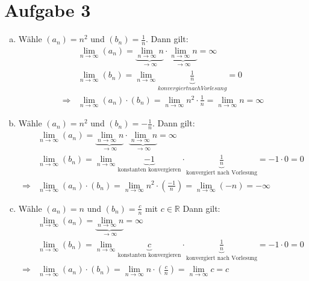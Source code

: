 \documentclass{scrreprt}
\newcommand{\RR}{\mathbb{R}}
\begin{document}
	\section*{Aufgabe 3}
	\begin{enumerate}[(a)]
		\item
			Wähle $(a_n) = n^2$ und $(b_n) = \frac{1}{n}$. Dann gilt:
			\begin{align*}
				&\lim\limits_{n \to \infty} (a_n) = \underbrace{\lim\limits_{n \to \infty} n}_{\rightarrow\infty} \cdot \underbrace{\lim\limits_{n \to \infty} n}_{\rightarrow\infty} = \infty\\
				&\lim\limits_{n \to \infty} (b_n) = \lim\limits_{n \to \infty} \underbrace{\frac{1}{n}}_{konvergiert nach Vorlesung} = 0\\
				\Rightarrow& \lim\limits_{n \to \infty} (a_n) \cdot (b_n) = \lim\limits_{n \to \infty} n^2 \cdot \frac{1}{n} = \lim\limits_{n \to \infty} n = \infty
			\end{align*}
		\item
			Wähle $(a_n) = n^2$ und $(b_n) = -\frac{1}{n}$. Dann gilt:
			\begin{align*}
				&\lim\limits_{n \to \infty} (a_n) = \underbrace{\lim\limits_{n \to \infty} n}_{\rightarrow\infty} \cdot \underbrace{\lim\limits_{n \to \infty} n}_{\rightarrow\infty} = \infty\\
				&\lim\limits_{n \to \infty} (b_n) = \lim\limits_{n \to \infty} \underbrace{-1}_{\text{konstanten konvergieren}} \cdot \underbrace{\frac{1}{n}}_{\text{konvergiert nach Vorlesung}} = -1 \cdot 0 = 0 \\
				\Rightarrow& \lim\limits_{n \to \infty} (a_n) \cdot (b_n) = \lim\limits_{n \to \infty} n^2 \cdot \left(\frac{-1}{n}\right) = \lim\limits_{n \to \infty} (-n) = -\infty
			\end{align*}
		\item
			Wähle $(a_n) = n$ und $(b_n) = \frac{c}{n}$ mit $c \in \RR$ Dann gilt:
			\begin{align*}
				&\lim\limits_{n \to \infty} (a_n) = \underbrace{\lim\limits_{n \to \infty} n}_{\rightarrow\infty} = \infty\\
				&\lim\limits_{n \to \infty} (b_n) = \lim\limits_{n \to \infty} \underbrace{c}_{\text{konstanten konvergieren}} \cdot \underbrace{\frac{1}{n}}_{\text{konvergiert nach Vorlesung}} = -1 \cdot 0 = 0 \\
				\Rightarrow& \lim\limits_{n \to \infty} (a_n) \cdot (b_n) = \lim\limits_{n \to \infty} n \cdot \left(\frac{c}{n}\right) = \lim\limits_{n \to \infty} c = c

\end{align*}
\end{enumerate}
\end{document}
